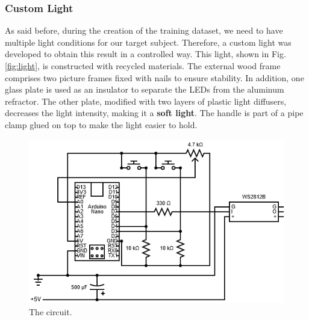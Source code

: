 \documentclass[preprint]{elsarticle}
\begin{document}
\subsubsection{Custom Light}


As said before, during the creation of the training dataset, we need to have multiple 
light conditions for our target subject. 
Therefore, a custom light was developed to obtain this result in a controlled way.
This light, shown in Fig. \ref{fig:light}, is constructed with recycled materials.
The external wood frame comprises two picture frames fixed with nails to ensure stability. 
In addition, one glass plate is used as an insulator to separate the LEDs from the aluminum refractor.
The other plate, modified with two layers of plastic light diffusers, 
decreases the light intensity, making it a \textbf{soft light}.
The handle is part of a pipe clamp glued on top to make the light easier to hold.

\begin{figure}[H]
	\centering
	\includegraphics[scale=0.5, keepaspectratio]{img/project_img/circuit-light.png}
	\caption{The circuit.}
	\label{fig:light-circuit}
\end{figure}
\end{document}
